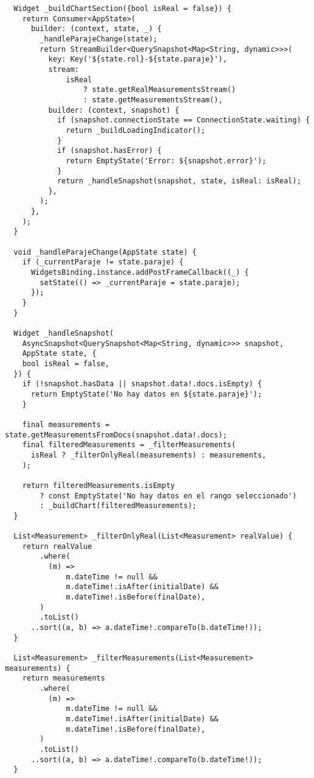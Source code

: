 \begin{verbatim}
  Widget _buildChartSection({bool isReal = false}) {
    return Consumer<AppState>(
      builder: (context, state, _) {
        _handleParajeChange(state);
        return StreamBuilder<QuerySnapshot<Map<String, dynamic>>>(
          key: Key('${state.rol}-${state.paraje}'),
          stream:
              isReal
                  ? state.getRealMeasurementsStream()
                  : state.getMeasurementsStream(),
          builder: (context, snapshot) {
            if (snapshot.connectionState == ConnectionState.waiting) {
              return _buildLoadingIndicator();
            }
            if (snapshot.hasError) {
              return EmptyState('Error: ${snapshot.error}');
            }
            return _handleSnapshot(snapshot, state, isReal: isReal);
          },
        );
      },
    );
  }

  void _handleParajeChange(AppState state) {
    if (_currentParaje != state.paraje) {
      WidgetsBinding.instance.addPostFrameCallback((_) {
        setState(() => _currentParaje = state.paraje);
      });
    }
  }

  Widget _handleSnapshot(
    AsyncSnapshot<QuerySnapshot<Map<String, dynamic>>> snapshot,
    AppState state, {
    bool isReal = false,
  }) {
    if (!snapshot.hasData || snapshot.data!.docs.isEmpty) {
      return EmptyState('No hay datos en ${state.paraje}');
    }

    final measurements = state.getMeasurementsFromDocs(snapshot.data!.docs);
    final filteredMeasurements = _filterMeasurements(
      isReal ? _filterOnlyReal(measurements) : measurements,
    );

    return filteredMeasurements.isEmpty
        ? const EmptyState('No hay datos en el rango seleccionado')
        : _buildChart(filteredMeasurements);
  }

  List<Measurement> _filterOnlyReal(List<Measurement> realValue) {
    return realValue
        .where(
          (m) =>
              m.dateTime != null &&
              m.dateTime!.isAfter(initialDate) &&
              m.dateTime!.isBefore(finalDate),
        )
        .toList()
      ..sort((a, b) => a.dateTime!.compareTo(b.dateTime!));
  }

  List<Measurement> _filterMeasurements(List<Measurement> measurements) {
    return measurements
        .where(
          (m) =>
              m.dateTime != null &&
              m.dateTime!.isAfter(initialDate) &&
              m.dateTime!.isBefore(finalDate),
        )
        .toList()
      ..sort((a, b) => a.dateTime!.compareTo(b.dateTime!));
  }


\end{verbatim}
